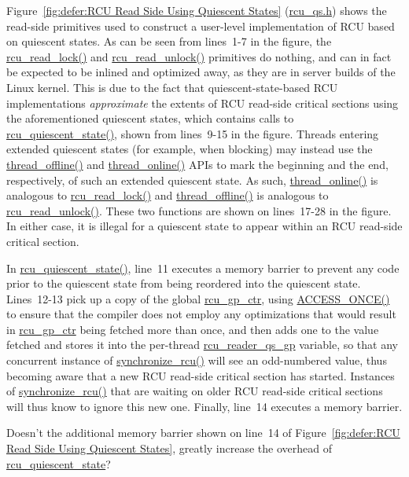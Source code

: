 Figure~\ref{fig:defer:RCU Read Side Using Quiescent States}
(\url{rcu_qs.h})
shows the read-side primitives used to construct a user-level
implementation of RCU based on quiescent states.
As can be seen from lines~1-7 in the figure, the \url{rcu_read_lock()}
and \url{rcu_read_unlock()} primitives do nothing, and can in fact
be expected to be inlined and optimized away, as they are in
server builds of the Linux kernel.
This is due to the fact that quiescent-state-based RCU implementations
\emph{approximate} the extents of RCU read-side critical sections
using the aforementioned quiescent states, which contains calls to
\url{rcu_quiescent_state()}, shown from lines~9-15 in the figure.
Threads entering extended quiescent states (for example, when blocking)
may instead use the \url{thread_offline()} and \url{thread_online()}
APIs to mark the beginning and the end, respectively, of such an
extended quiescent state.
As such, \url{thread_online()} is analogous to \url{rcu_read_lock()}
and \url{thread_offline()} is analogous to \url{rcu_read_unlock()}.
These two functions are shown on lines~17-28 in the figure.
In either case, it is illegal for a quiescent state to appear within
an RCU read-side critical section.

In \url{rcu_quiescent_state()}, line~11 executes a memory barrier
to prevent any code prior to the quiescent state from being reordered
into the quiescent state.
Lines~12-13 pick up a copy of the global \url{rcu_gp_ctr}, using
\url{ACCESS_ONCE()} to ensure that the compiler does not employ any
optimizations that would result in \url{rcu_gp_ctr} being fetched
more than once,
and then adds one to the value fetched and stores it into
the per-thread \url{rcu_reader_qs_gp} variable, so that any concurrent
instance of \url{synchronize_rcu()} will see an odd-numbered value,
thus becoming aware that a new RCU read-side critical section has started.
Instances of \url{synchronize_rcu()} that are waiting on older
RCU read-side critical sections will thus know to ignore this new one.
Finally, line~14 executes a memory barrier.

\QuickQuiz{}
	Doesn't the additional memory barrier shown on line~14 of
	Figure~\ref{fig:defer:RCU Read Side Using Quiescent States},
	greatly increase the overhead of \url{rcu_quiescent_state}?
 \QuickQuizEnd

